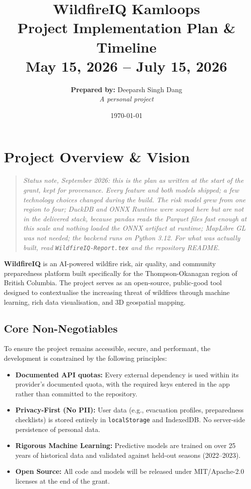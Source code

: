 \documentclass[12pt,letterpaper]{article}
\title{
    \vspace*{2cm}
    \Huge \textbf{WildfireIQ Kamloops}\\
    \vspace{0.5cm}
    \Large Project Implementation Plan \& Timeline\\
    \vspace{0.5cm}
    \large May 15, 2026 -- July 15, 2026
    \vspace{2cm}
}
\author{
    \textbf{Prepared by:} Deeparsh Singh Dang \\
    \textit{A personal project}
}
\date{\vspace{1cm}\today}
\begin{document}
\maketitle
\thispagestyle{empty}
\newpage

\tableofcontents
\newpage

\section{Project Overview \& Vision}

\begin{quote}
\small\itshape Status note, September 2026: this is the plan as written at the
start of the grant, kept for provenance. Every feature and both models shipped;
a few technology choices changed during the build. The risk model grew from one
region to four; DuckDB and ONNX Runtime were scoped here but are not in the
delivered stack, because pandas reads the Parquet files fast enough at this
scale and nothing loaded the ONNX artifact at runtime; MapLibre GL was not
needed; the backend runs on Python 3.12. For what was actually built, read
\texttt{WildfireIQ-Report.tex} and the repository README.
\end{quote}

\textbf{WildfireIQ} is an AI-powered wildfire risk, air quality, and community preparedness platform built specifically for the Thompson-Okanagan region of British Columbia. The project serves as an open-source, public-good tool designed to contextualise the increasing threat of wildfires through machine learning, rich data visualisation, and 3D geospatial mapping.

\subsection*{Core Non-Negotiables}
To ensure the project remains accessible, secure, and performant, the development is constrained by the following principles:
\begin{itemize}
    \item \textbf{Documented API quotas:} Every external dependency is used within its provider's documented quota, with the required keys entered in the app rather than committed to the repository.
    \item \textbf{Privacy-First (No PII):} User data (e.g., evacuation profiles, preparedness checklists) is stored entirely in \texttt{localStorage} and IndexedDB. No server-side persistence of personal data.
    \item \textbf{Rigorous Machine Learning:} Predictive models are trained on over 25 years of historical data and validated against held-out seasons (2022--2023). 
    \item \textbf{Open Source:} All code and models will be released under MIT/Apache-2.0 licenses at the end of the grant.
\end{itemize}
\end{document}
